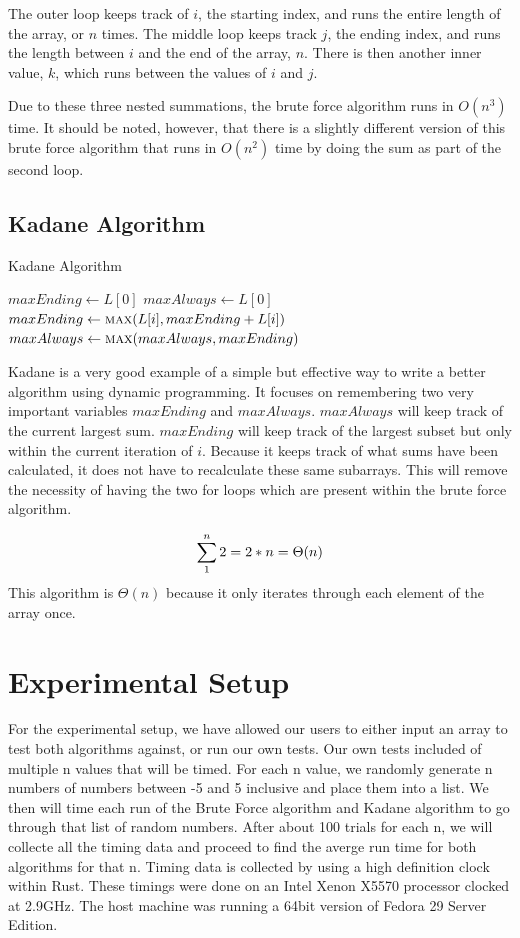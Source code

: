 \documentclass[10pt, letterpaper]{article}
\begin{document}
	The outer loop keeps track of $i$, the starting index, and runs the entire length of the array, or $n$ times.
	The middle loop keeps track $j$, the ending index, and runs the length between $i$ and the end of the array, $n$.
	There is then another inner value, $k$, which runs between the values of $i$ and $j$.

	Due to these three nested summations, the brute force algorithm runs in $O(n^3)$ time.
	It should be noted, however, that there is a slightly different version of this brute force algorithm that runs in $O(n^2)$ time by doing the sum as part of the second loop.

	\subsection{Kadane Algorithm}

  \begin{algorithm}
		\caption{Kadane Algorithm}\label{kadane}
	\begin{algorithmic}
    \State $maxEnding \gets L[0]$
    \State $maxAlways \gets L[0]$
    \State $maxEnding \gets \Call{max}{L[i], maxEnding + L[i]}$
    \State $maxAlways \gets \Call{max}{maxAlways, maxEnding}$
    \EndFor
	  \EndFunction
	\end{algorithmic}
	\end{algorithm}
  Kadane is a very good example of a simple but effective way to write a better algorithm using dynamic programming.
  It focuses on remembering two very important variables $maxEnding$ and $maxAlways$.
  $maxAlways$ will keep track of the current largest sum.
  $maxEnding$ will keep track of the largest subset but only within the current iteration of $i$. Because it keeps track of what sums have been calculated, it does not have to recalculate these same subarrays.
  This will remove the necessity of having the two for loops which are present within the brute force algorithm.

  \[
  \sum_1^n2 \\
  = 2 * n \\
  = \Theta(n)
		\]
	This algorithm is $\Theta(n)$ because it only iterates through each element of the array once.
	\section{Experimental Setup}
	For the experimental setup, we have allowed our users to either input an array to test both algorithms against, or run our own tests.
  Our own tests included of multiple n values that will be timed. For each n value, we randomly generate n numbers of numbers between -5 and 5 inclusive and place them into a list. We then will time each run of the Brute Force algorithm and Kadane algorithm to go through that list of random numbers. After about 100 trials for each n, we will collecte all the timing data and proceed to find the averge run time for both algorithms for that n.
  Timing data is collected by using a high definition clock within Rust. These timings were done on an Intel Xenon X5570 processor clocked at 2.9GHz. The host machine was running a 64bit version of Fedora 29 Server Edition.
\end{document}
